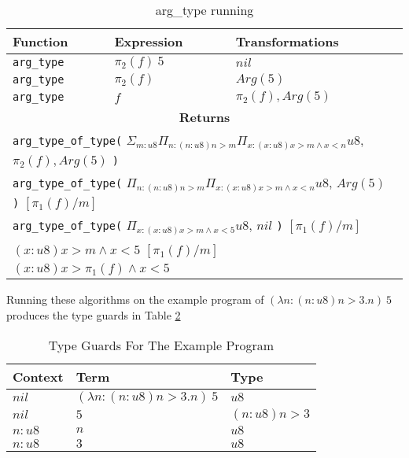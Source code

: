 \begin{table}
    \centering
    \begin{tabular}{|l|l|l|}
        \hline
        \textbf{Function} & \textbf{Expression} & \textbf{Transformations}\\\hline
        \texttt{arg\_type} & $\pi_2(f)\ 5$ & $nil$\\\hline
        \texttt{arg\_type} & $\pi_2(f)$ & $Arg(5)$\\\hline
        \texttt{arg\_type} & $f$ & $\pi_2(f), Arg(5)$\\\hline
        \multicolumn{3}{|c|}{
            \textbf{Returns}
        }\\\hline
        \multicolumn{3}{|l|}{
            \texttt{arg\_type\_of\_type(}
            $\Sigma_{m:u8} \Pi_{n:(n:u8) n > m} \Pi_{x:(x:u8) x > m \land x < n} u8$, \quad
            $\pi_2(f), Arg(5)$
            \texttt{)}
        }\\\hline
        \multicolumn{3}{|l|}{
            \texttt{arg\_type\_of\_type(}
            $\Pi_{n:(n:u8) n > m} \Pi_{x:(x:u8) x > m \land x < n} u8$, \quad
            $Arg(5)$
            \texttt{)}
            $[\pi_1(f) / m]$
        }\\\hline
        \multicolumn{3}{|l|}{
            \texttt{arg\_type\_of\_type(}
            $\Pi_{x:(x:u8) x > m \land x < 5} u8$, \quad
            $nil$
            \texttt{)}
            $[\pi_1(f) / m]$
        }\\\hline
        \multicolumn{3}{|l|}{
            $(x:u8) x > m \land x < 5$ \quad
            $[\pi_1(f) / m]$
        }\\\hline
        \multicolumn{3}{|l|}{
            $(x:u8) x > \pi_1(f) \land x < 5$
        }\\\hline
    \end{tabular}
    \caption{arg\_type running}
    \label{tab:arg_type}
\end{table}

Running these algorithms on the example program of $(\lambda n : (n: u8) n > 3 . n)\ 5$ produces the
type guards in Table \ref{tab:example_guards}

\begin{table}
    \centering
    \begin{tabular}{|l|l|l|}
        \hline
        \textbf{Context} & \textbf{Term} & \textbf{Type}\\\hline
        $nil$ & $(\lambda n: (n: u8) n > 3 . n)\ 5$ & $u8$\\\hline
        $nil$ & $5$ & $(n: u8) n > 3$\\\hline
        $n: u8$ & $n$ & $u8$\\\hline
        $n: u8$ & $3$ & $u8$\\\hline
    \end{tabular}
    \caption{Type Guards For The Example Program}
    \label{tab:example_guards}
\end{table}

